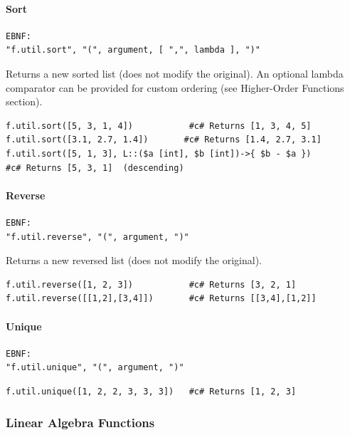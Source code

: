 \paragraph{Sort}
\begin{verbatim}
EBNF:
"f.util.sort", "(", argument, [ ",", lambda ], ")"
\end{verbatim}
Returns a new sorted list (does not modify the original). An optional lambda comparator can be provided for custom ordering (see Higher-Order Functions section).
\begin{verbatim}
f.util.sort([5, 3, 1, 4])           #c# Returns [1, 3, 4, 5]
f.util.sort([3.1, 2.7, 1.4])       #c# Returns [1.4, 2.7, 3.1]
f.util.sort([5, 1, 3], L::($a [int], $b [int])->{ $b - $a })
#c# Returns [5, 3, 1]  (descending)
\end{verbatim}

\paragraph{Reverse}
\begin{verbatim}
EBNF:
"f.util.reverse", "(", argument, ")"
\end{verbatim}
Returns a new reversed list (does not modify the original).
\begin{verbatim}
f.util.reverse([1, 2, 3])           #c# Returns [3, 2, 1]
f.util.reverse([[1,2],[3,4]])       #c# Returns [[3,4],[1,2]]
\end{verbatim}

\paragraph{Unique}
\begin{verbatim}
EBNF:
"f.util.unique", "(", argument, ")"
\end{verbatim}
\begin{verbatim}
f.util.unique([1, 2, 2, 3, 3, 3])   #c# Returns [1, 2, 3]
\end{verbatim}

\subsubsection{Linear Algebra Functions}

